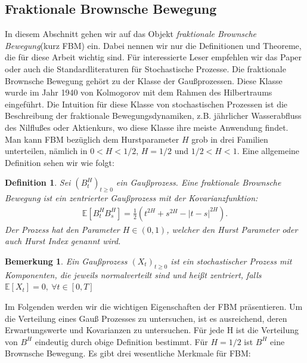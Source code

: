 \documentclass[12pt,titlepage,headsepline]{article}
\newtheorem{definition}{Definition}[section]
\newtheorem*{bemerkung*}{Bemerkung}
\begin{document}
      \subsection{Fraktionale Brownsche Bewegung}\label{appendix:fbm}
      In diesem Abschnitt gehen wir auf das Objekt \textit{fraktionale Brownsche Bewegung}(kurz FBM) ein. Dabei nennen wir nur die Definitionen und Theoreme, die für diese Arbeit wichtig sind. Für interessierte Leser empfehlen wir das Paper \cite{shevchenko_fractional_2014} oder auch die Standardliteraturen für Stochastische Prozesse.
      Die fraktionale Brownsche Bewegung gehört zu der Klasse der Gaußprozessen. Diese Klasse wurde im Jahr 1940 von Kolmogorov mit dem Rahmen des Hilbertraums eingeführt. Die Intuition für diese Klasse von stochastischen Prozessen ist die Beschreibung der fraktionale Bewegungsdynamiken, z.B. jährlicher Wasserabfluss des Nilflußes oder Aktienkurs, wo diese Klasse ihre meiste Anwendung findet. Man kann FBM bezüglich dem Hurstparameter $H$ grob in drei Familien unterteilen, nämlich in $0<H<1/2$, $H=1/2$ und $1/2<H<1$. Eine allgemeine Definition sehen wir wie folgt:
      \begin{definition}
        Sei $(B_t^H)_{t \geq 0}$ ein Gaußprozess. Eine fraktionale Brownsche Bewegung ist ein zentrierter Gaußprozess mit der Kovarianzfunktion:
        \begin{align*}
          \mathbb{E}[B_t^HB_s^H]=\frac{1}{2}(t^{2H}+s^{2H}-{\lvert t-s \rvert}^{2H}).
        \end{align*}
        Der Prozess hat den Parameter $H \in (0,1) $, welcher den Hurst Parameter oder auch Hurst Index genannt wird.
      \end{definition}
      \begin{bemerkung*}
        \textup{
        Ein Gaußprozess $(X_t)_{t \geq 0}$ ist ein stochastischer Prozess mit Komponenten, die jeweils normalverteilt sind und heißt zentriert, falls $\mathbb{E}[X_t]=0, \ \forall t \in [0,T]$
        }
      \end{bemerkung*}
      Im Folgenden werden wir die wichtigen Eigenschaften der FBM präsentieren. Um die Verteilung eines Gauß Prozesses zu untersuchen, ist es ausreichend, deren Erwartungswerte und Kovarianzen zu untersuchen. Für jede H ist die Verteilung von $B^H$ eindeutig durch obige Definition bestimmt. Für $H = 1/2$ ist $B^H$ eine Brownsche Bewegung. Es gibt drei wesentliche Merkmale für FBM:
\end{document}
